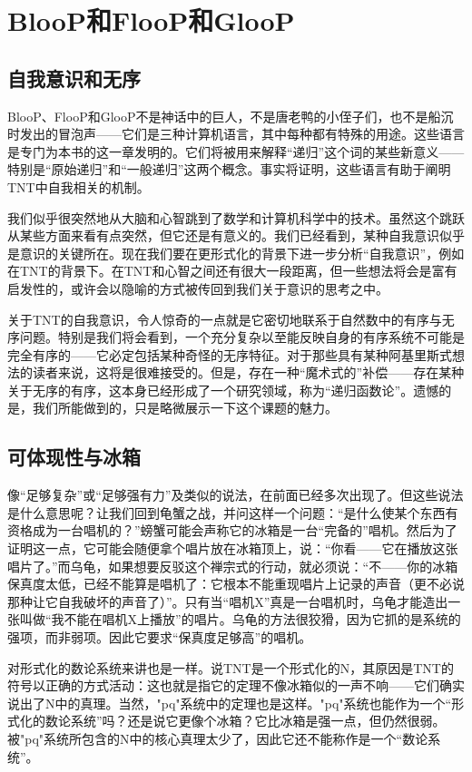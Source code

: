 
\chapter{BlooP和FlooP和GlooP}

\section{自我意识和无序}

BlooP、FlooP和GlooP不是神话中的巨人，不是唐老鸭的小侄子们，也不是船沉时发出的冒泡声——它们是三种计算机语言，其中每种都有特殊的用途。这些语言是专门为本书的这一章发明的。它们将被用来解释“递归”这个词的某些新意义——特别是“原始递归”和“一般递归”这两个概念。事实将证明，这些语言有助于阐明TNT中自我相关的机制。

我们似乎很突然地从大脑和心智跳到了数学和计算机科学中的技术。虽然这个跳跃从某些方面来看有点突然，但它还是有意义的。我们已经看到，某种自我意识似乎是意识的关键所在。现在我们要在更形式化的背景下进一步分析“自我意识”，例如在TNT的背景下。在TNT和心智之间还有很大一段距离，但一些想法将会是富有启发性的，或许会以隐喻的方式被传回到我们关于意识的思考之中。

关于TNT的自我意识，令人惊奇的一点就是它密切地联系于自然数中的有序与无序问题。特别是我们将会看到，一个充分复杂以至能反映自身的有序系统不可能是完全有序的——它必定包括某种奇怪的无序特征。对于那些具有某种阿基里斯式想法的读者来说，这将是很难接受的。但是，存在一种“魔术式的”补偿——存在某种关于无序的有序，这本身已经形成了一个研究领域，称为“递归函数论”。遗憾的是，我们所能做到的，只是略微展示一下这个课题的魅力。

\section{可体现性与冰箱}

像“足够复杂”或“足够强有力”及类似的说法，在前面已经多次出现了。但这些说法是什么意思呢？让我们回到龟蟹之战，并问这样一个问题：“是什么使某个东西有资格成为一台唱机的？”螃蟹可能会声称它的冰箱是一台“完备的”唱机。然后为了证明这一点，它可能会随便拿个唱片放在冰箱顶上，说：“你看——它在播放这张唱片了。”而乌龟，如果想要反驳这个禅宗式的行动，就必须说：“不——你的冰箱保真度太低，已经不能算是唱机了：它根本不能重现唱片上记录的声音（更不必说那种让它自我破坏的声音了）”。只有当“唱机X”真是一台唱机时，乌龟才能造出一张叫做“我不能在唱机X上播放”的唱片。乌龟的方法很狡猾，因为它抓的是系统的强项，而非弱项。因此它要求“保真度足够高”的唱机。

对形式化的数论系统来讲也是一样。说TNT是一个形式化的N，其原因是TNT的符号以正确的方式活动：这也就是指它的定理不像冰箱似的一声不响——它们确实说出了N中的真理。当然，"pq"系统中的定理也是这样。"pq"系统也能作为一个“形式化的数论系统”吗？还是说它更像个冰箱？它比冰箱是强一点，但仍然很弱。被"pq"系统所包含的N中的核心真理太少了，因此它还不能称作是一个“数论系统”。

